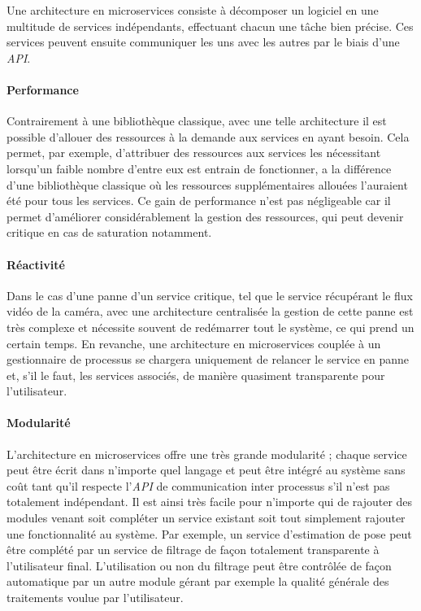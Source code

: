 Une architecture en microservices consiste à décomposer un logiciel en une multitude de services indépendants, effectuant chacun une tâche bien précise. Ces services peuvent ensuite communiquer les uns avec les autres par le biais d'une \emph{API}.

\paragraph{Performance} Contrairement à une bibliothèque classique, avec une telle architecture il est possible d'allouer des ressources à la demande aux services en ayant besoin. Cela permet, par exemple, d'attribuer des ressources aux services les nécessitant lorsqu'un faible nombre d'entre eux est entrain de fonctionner, a la différence d'une bibliothèque classique où les ressources supplémentaires allouées l'auraient été pour tous les services. Ce gain de performance n'est pas négligeable car il permet d'améliorer considérablement la gestion des ressources, qui peut devenir critique en cas de saturation notamment.

\paragraph{Réactivité} Dans le cas d'une panne d'un service critique, tel que le service récupérant le flux vidéo de la caméra, avec une architecture centralisée la gestion de cette panne est très complexe et nécessite souvent de redémarrer tout le système, ce qui prend un certain temps. En revanche, une architecture en microservices couplée à un gestionnaire de processus se chargera uniquement de relancer le service en panne et, s'il le faut, les services associés, de manière quasiment transparente pour l'utilisateur.

\paragraph{Modularité} L'architecture en microservices offre une très grande modularité ; chaque service peut être écrit dans n'importe quel langage et peut être intégré au système sans coût tant qu'il respecte l'\emph{API} de communication inter processus s'il n'est pas totalement indépendant. Il est ainsi très facile pour n'importe qui de rajouter des modules venant soit compléter un service existant soit tout simplement rajouter une fonctionnalité au système. Par exemple, un service d'estimation de pose peut être complété par un service de filtrage de façon totalement transparente à l'utilisateur final. L'utilisation ou non du filtrage peut être contrôlée de façon automatique par un autre module gérant par exemple la qualité générale des traitements voulue par l'utilisateur.

